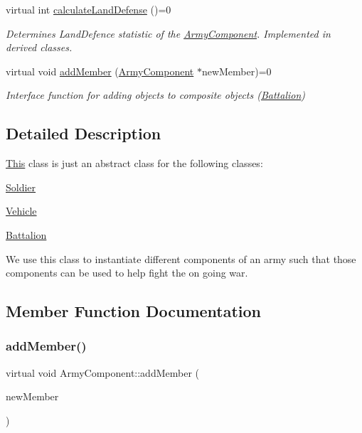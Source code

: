 \begin{DoxyCompactItemize}
virtual int \mbox{\hyperlink{class_army_component_a88558b28106a5d461fcc9ca2eb8e7a40}{calculate\+Land\+Defense}} ()=0
\begin{DoxyCompactList}\small\item\em Determines Land\+Defence statistic of the \mbox{\hyperlink{class_army_component}{Army\+Component}}. Implemented in derived classes. \end{DoxyCompactList}\item 
virtual void \mbox{\hyperlink{class_army_component_aae30fdd85af73102e011cb053ddb96b3}{add\+Member}} (\mbox{\hyperlink{class_army_component}{Army\+Component}} $\ast$new\+Member)=0
\begin{DoxyCompactList}\small\item\em Interface function for adding objects to composite objects (\mbox{\hyperlink{class_battalion}{Battalion}}) \end{DoxyCompactList}\end{DoxyCompactItemize}


\subsection{Detailed Description}
\mbox{\hyperlink{class_this}{This}} class is just an abstract class for the following classes\+:
\begin{DoxyItemize}
\item \mbox{\hyperlink{class_soldier}{Soldier}}
\item \mbox{\hyperlink{class_vehicle}{Vehicle}}
\item \mbox{\hyperlink{class_battalion}{Battalion}}
\end{DoxyItemize}

We use this class to instantiate different components of an army such that those components can be used to help fight the on going war. 

\subsection{Member Function Documentation}
\mbox{\label{class_army_component_aae30fdd85af73102e011cb053ddb96b3}} 
\subsubsection{\texorpdfstring{addMember()}{addMember()}}
{\footnotesize\ttfamily virtual void Army\+Component\+::add\+Member (\begin{DoxyParamCaption}\item[{\mbox{\hyperlink{class_army_component}{Army\+Component}} $\ast$}]{new\+Member }\end{DoxyParamCaption})\hspace{0.3cm}{\ttfamily [pure virtual]}}



